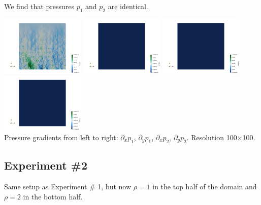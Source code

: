 We find that pressures $p_1$ and $p_2$ are identical.
\begin{center}
\includegraphics[width=4cm]{python_codes/fieldstone_119/results/exp1/dp1dx}
\includegraphics[width=4cm]{python_codes/fieldstone_119/results/exp1/dp1dy}
\includegraphics[width=4cm]{python_codes/fieldstone_119/results/exp1/dp2dx}
\includegraphics[width=4cm]{python_codes/fieldstone_119/results/exp1/dp2dy}\\
{\captionfont 
Pressure gradients from left to right: $\partial_xp_1$, $\partial_yp_1$, $\partial_xp_2$, $\partial_yp_2$. 
Resolution 100$\times$100.}
\end{center}

\subsection*{Experiment \#2}

Same setup as Experiment \# 1, but now $\rho=1$ in the top half of the domain and $\rho=2$ in the bottom half.

